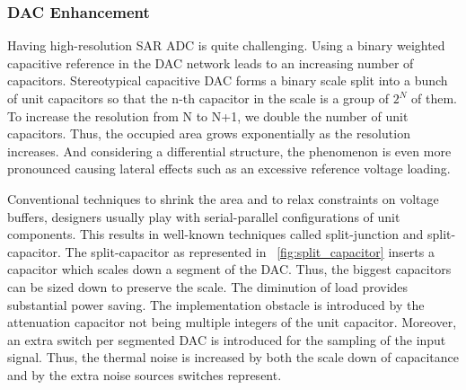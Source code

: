 \subsubsection{DAC Enhancement}	
Having high-resolution SAR ADC is quite challenging. Using a binary weighted capacitive reference in the DAC network leads to an increasing number of capacitors. Stereotypical capacitive DAC forms a binary scale split into a bunch of unit capacitors so that the n-th capacitor in the scale is a group of \(2^N\) of them. To increase the resolution from N to N+1, we double the number of unit capacitors. Thus, the occupied area grows exponentially as the resolution increases. And considering a differential structure, the phenomenon is even more pronounced causing lateral effects such as an excessive reference voltage loading.

Conventional techniques to shrink the area and to relax constraints on voltage buffers, designers usually play with serial-parallel configurations of unit components. This results in well-known techniques called split-junction and split-capacitor. The split-capacitor as represented in \figurename~\ref{fig:split_capacitor} inserts a capacitor which scales down a segment of the DAC\@. Thus, the biggest capacitors can be sized down to preserve the scale. The diminution of load provides substantial power saving. The implementation obstacle is introduced by the attenuation capacitor not being multiple integers of the unit capacitor. Moreover, an extra switch per segmented DAC is introduced for the sampling of the input signal. Thus, the thermal noise is increased by both the scale down of capacitance and by the extra noise sources switches represent.

